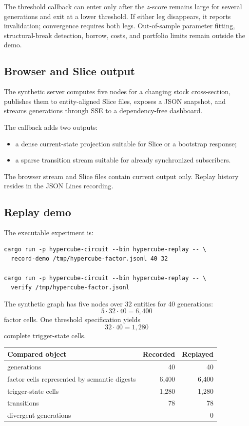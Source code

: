 \documentclass{strategynet-journal}
\newcommand{\SLICE}{\textsf{Slice}}
\begin{document}
The threshold callback can enter only after the \(z\)-score remains large for
several generations and exit at a lower threshold.  If either leg disappears,
it reports invalidation; convergence requires both legs.  Out-of-sample parameter
fitting, structural-break detection, borrow, costs, and portfolio limits remain
outside the demo.

\subsection{Browser and \SLICE{} output}

The synthetic server computes five nodes for a changing stock cross-section,
publishes them to entity-aligned \SLICE{} files, exposes a JSON snapshot, and
streams generations through SSE to a dependency-free dashboard.

The callback adds two outputs:
\begin{itemize}
  \item a dense current-state projection suitable for \SLICE{} or a bootstrap
        response;
  \item a sparse transition stream suitable for already synchronized
        subscribers.
\end{itemize}
The browser stream and \SLICE{} files contain current output only.  Replay
history resides in the JSON Lines recording.

\subsection{Replay demo}

The executable experiment is:
\begin{lstlisting}[style=circuit]
cargo run -p hypercube-circuit --bin hypercube-replay -- \
  record-demo /tmp/hypercube-factor.jsonl 40 32

cargo run -p hypercube-circuit --bin hypercube-replay -- \
  verify /tmp/hypercube-factor.jsonl
\end{lstlisting}

The synthetic graph has five nodes over 32 entities for 40 generations:
\[
  5\cdot32\cdot40=6{,}400
\]
factor cells.  One threshold specification yields
\[
  32\cdot40=1{,}280
\]
complete trigger-state cells.

\begin{center}
\begin{tabularx}{0.82\textwidth}{@{}X r r@{}}
\toprule
Compared object & Recorded & Replayed \\
\midrule
generations & 40 & 40 \\
factor cells represented by semantic digests & 6,400 & 6,400 \\
trigger-state cells & 1,280 & 1,280 \\
transitions & 78 & 78 \\
divergent generations & \multicolumn{2}{r}{0} \\
\bottomrule
\end{tabularx}
\end{center}
\end{document}
